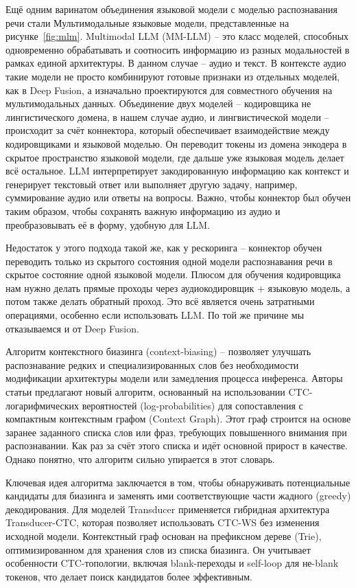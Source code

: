 Ещё одним варинатом объединения языковой модели с моделью распознавания речи стали Мультимодальные языковые модели, представленные на рисунке~\ref{fig:mlm}.
Multimodal LLM (MM-LLM)\cite{grattafiori2024llama, chu2023qwen, tang2023salmonn, radhakrishnan2023whispering} -- это класс моделей, способных одновременно обрабатывать и соотносить информацию из разных модальностей в рамках единой архитектуры.
В данном случае -- аудио и текст.
В контексте аудио такие модели не просто комбинируют готовые признаки из отдельных моделей, как в Deep Fusion, а изначально проектируются для совместного обучения на мультимодальных данных.
Объединение двух моделей -- кодировщика не лингистического домена, в нашем случае аудио, и лингвистической модели -- происходит за счёт коннектора, который обеспечивает взаимодействие между кодировщиками и языковой моделью\cite{li2022blip,radford2021learning,chu2023qwen}.
Он переводит токены из домена энкодера в скрытое пространство языковой модели, где дальше уже языковая модель делает всё остальное.
LLM интерпретирует закодированную информацию как контекст и генерирует текстовый ответ или выполняет другую задачу, например, суммирование аудио или ответы на вопросы.
Важно, чтобы коннектор был обучен таким образом, чтобы сохранять важную информацию из аудио и преобразовывать её в форму, удобную для LLM.

Недостаток у этого подхода такой же, как у рескоринга -- коннектор обучен переводить только из скрытого состояния одной модели распознавания речи в скрытое состояние одной языковой модели.
Плюсом для обучения кодировщика нам нужно делать прямые проходы через аудиокодировщик + языковую модель, а потом также делать обратный проход.
Это всё является очень затратными операциями, особенно если использовать LLM.
По той же причине мы отказываемся и от Deep Fusion.

Алгоритм контекстного биазинга (context-biasing)\cite{andrusenko2024fast} --  позволяет улучшать распознавание редких и специализированных слов без необходимости модификации архитектуры модели или замедления процесса инференса.
Авторы статьи предлагают новый алгоритм, основанный на использовании CTC-логарифмических вероятностей (log-probabilities) для сопоставления с компактным контекстным графом (Context Graph).
Этот граф строится на основе заранее заданного списка слов или фраз, требующих повышенного внимания при распознавании.
Как раз за счёт этого списка и идёт основной прирост в качестве.
Однако понятно, что алгоритм сильно упирается в этот словарь.

Ключевая идея алгоритма заключается в том, чтобы обнаруживать потенциальные кандидаты для биазинга и заменять ими соответствующие части жадного (greedy) декодирования.
Для моделей Transducer применяется гибридная архитектура Transducer-CTC, которая позволяет использовать CTC-WS без изменения исходной модели.
Контекстный граф основан на префиксном дереве (Trie), оптимизированном для хранения слов из списка биазинга.
Он учитывает особенности CTC-топологии, включая blank-переходы и self-loop для не-blank токенов, что делает поиск кандидатов более эффективным.

